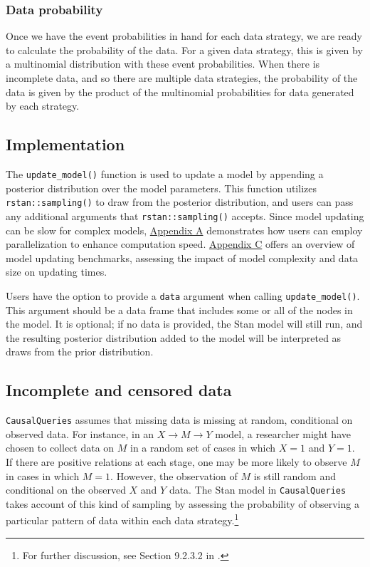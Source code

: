 \documentclass[
  11pt,
  article]{jss}
\begin{document}
\subsubsection{Data probability}\label{data-probability}

Once we have the event probabilities in hand for each data strategy, we
are ready to calculate the probability of the data. For a given data
strategy, this is given by a multinomial distribution with these event
probabilities. When there is incomplete data, and so there are multiple
data strategies, the probability of the data is given by the product of
the multinomial probabilities for data generated by each strategy.

\subsection{Implementation}\label{implementation}

The \texttt{update\_model()} function is used to update a model by
appending a posterior distribution over the model parameters. This
function utilizes \texttt{rstan::sampling()} to draw from the posterior
distribution, and users can pass any additional arguments that
\texttt{rstan::sampling()} accepts. Since model updating can be slow for
complex models, \hyperref[sec-parallel]{Appendix A} demonstrates how
users can employ parallelization to enhance computation speed.
\hyperref[sec-benchmark]{Appendix C} offers an overview of model
updating benchmarks, assessing the impact of model complexity and data
size on updating times.

Users have the option to provide a \texttt{data} argument when calling
\texttt{update\_model()}. This argument should be a data frame that
includes some or all of the nodes in the model. It is optional; if no
data is provided, the Stan model will still run, and the resulting
posterior distribution added to the model will be interpreted as draws
from the prior distribution.

\subsection{Incomplete and censored
data}\label{incomplete-and-censored-data}

\texttt{CausalQueries} assumes that missing data is missing at random,
conditional on observed data. For instance, in an
\(X \rightarrow M \rightarrow Y\) model, a researcher might have chosen
to collect data on \(M\) in a random set of cases in which \(X=1\) and
\(Y=1\). If there are positive relations at each stage, one may be more
likely to observe \(M\) in cases in which \(M=1\). However, the
observation of \(M\) is still random and conditional on the observed
\(X\) and \(Y\) data. The Stan model in \texttt{CausalQueries} takes
account of this kind of sampling by assessing the probability of
observing a particular pattern of data within each data
strategy.\footnote{For further discussion, see Section 9.2.3.2 in
  \citet{humphreys_integrated_2023}.}
\end{document}
